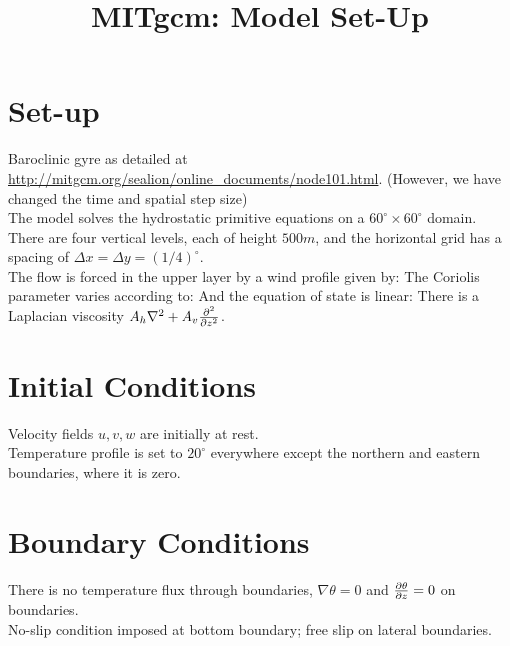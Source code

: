 \documentclass[10pt]{article}
\begin{document}
\title{MITgcm: Model Set-Up}
\date{}
\maketitle

\section{Set-up}

Baroclinic gyre as detailed at \url{http://mitgcm.org/sealion/online_documents/node101.html}. (However, we have changed the time and spatial step size)\\
\linebreak
The model solves the hydrostatic primitive equations on a $60^{\circ}\times 60^{\circ}$ domain. \\
\linebreak
There are four vertical levels, each of height $500m$, and the horizontal grid has a spacing of $\Delta x = \Delta y = (1/4)^{\circ}$. \\
\linebreak
The flow is forced in the upper layer by a wind profile given by:
The Coriolis parameter varies according to:
And the equation of state is linear:
There is a Laplacian viscosity $A_{h}\nabla^{2} + A_{v}\frac{\partial ^{2}}{\partial z^{2}}$.

\section{Initial Conditions}

Velocity fields $u,v,w$ are initially at rest. \\
\linebreak
Temperature profile is set to $20^\circ$ everywhere except the northern and eastern boundaries, where it is zero.

\section{Boundary Conditions}

There is no temperature flux through boundaries, $\nabla \theta = 0$ and $\frac{\partial \theta}{\partial z} = 0$ on boundaries. \\
\linebreak
No-slip condition imposed at bottom boundary; free slip on lateral boundaries. 
\end{document}
